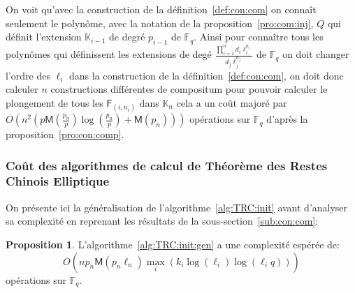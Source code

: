 \documentclass[10pt,a4paper]{book}
\theoremstyle{plain}
\theoremstyle{definition}
\theoremstyle{definition}
\theoremstyle{definition}
\newtheorem{prop}[thm]{Proposition}
\theoremstyle{definition}
\theoremstyle{remark}
\theoremstyle{remark}
\theoremstyle{definition}
\begin{document}
On voit qu'avec la construction de la définition~\ref{def:con:com} on connaît 
seulement le polynôme, avec la notation de la proposition~\ref{pro:com:inj}, $Q$
qui définit l'extension $\mathbb{K}_{i-1}$ de degré $p_{i-1}$ de 
$\mathbb{F}_q$. Ainsi pour connaître tous les polynômes qui définissent les 
extensions de degé $\frac{\prod_{i=1}^{n}d_i\ell_i^{n_i}}{d_j \ell_j^{n_j}}$ de
$\mathbb{F}_q$ on doit changer l'ordre des $\ell_i$ dans la construction de la 
définition~\ref{def:con:com}, on doit donc calculer $n$ constructions 
différentes de compositum pour pouvoir calculer le plongement de tous les 
$\mathsf{F}_{(i,n_i)}$ dans $\mathbb{K}_{n}$ cela a un coût majoré par 
$O(n^2(p\mathsf{M}(\frac{p_n}{p})\log(\frac{p_n}{p})+\mathsf{M}(p_n)))$ 
opérations sur $\mathbb{F}_q$ d'après la proposition~\ref{pro:con:comp}.

\subsubsection{Coût des algorithmes de calcul de Théorème des Restes Chinois Elliptique}

On présente ici la généralisation de l'algorithme~\ref{alg:TRC:init} avant 
d'analyser sa complexité en reprenant les résultats de la 
sous-section~\ref{sub:con:com}: 

\begin{prop}
\label{pro:alg:TRC:init:gen}
L'algorithme~\ref{alg:TRC:init:gen} a une complexité espérée de:
\[
O(n p_{n}\mathsf{M}(p_{n}\ell_{n})\max_i(k_{i}\log(\ell_{i})\log(\ell_{i}q)))
\] 
opérations sur $\mathbb{F}_q$.
\end{prop}
\end{document}
